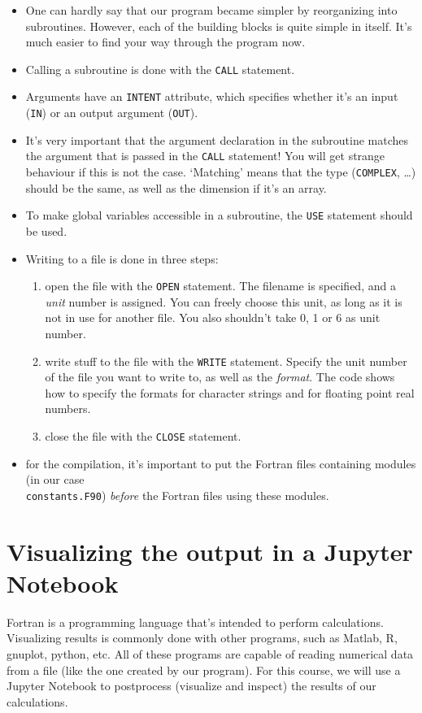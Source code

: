 \documentclass[a4paper]{article}
\begin{document}
\begin{itemize}
	\item One can hardly say that our program became simpler by reorganizing into subroutines. However, each of the building blocks is quite simple in itself. It's much easier to find your way through the program now.
	\item Calling a subroutine is done with the \verb+CALL+ statement. 
	\item Arguments have an \verb+INTENT+ attribute, which specifies whether it's an input (\verb+IN+) or an output argument (\verb+OUT+).
	\item It's very important that the argument declaration in the subroutine matches the argument that is passed in the \verb+CALL+ statement! You will get strange behaviour if this is not the case. `Matching' means that the type (\verb+COMPLEX+, \ldots) should be the same, as well as the dimension if it's an array.
	\item To make global variables accessible in a subroutine, the \verb+USE+ statement should be used.
	\item Writing to a file is done in three steps:
		\begin{enumerate}
			\item open the file with the \verb+OPEN+ statement. The filename is specified, and a \emph{unit} number is assigned. You can freely choose this unit, as long as it is not in use for another file. You also shouldn't take 0, 1 or 6 as unit number.
			\item write stuff to the file with the \verb+WRITE+ statement. Specify the unit number of the file you want to write to, as well as the \emph{format}. The code shows how to specify the formats for character strings and for floating point real numbers.
			\item close the file with the \verb+CLOSE+ statement.
		\end{enumerate}
	\item for the compilation, it's important to put the Fortran files containing modules (in our case\\ \verb+constants.F90+) \emph{before} the Fortran files using these modules.
\end{itemize}
%
\section{Visualizing the output in a Jupyter Notebook}
%
\par
Fortran is a programming language that's intended to perform calculations. Visualizing results is commonly done with other programs, such as Matlab, R, gnuplot, python, etc. All of these programs are capable of reading numerical data from a file (like the one created by our program). For this course, we will use a Jupyter Notebook to postprocess (visualize and inspect) the results of our calculations.
%
\end{document}

